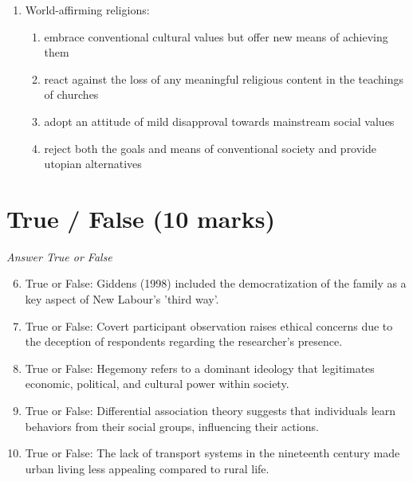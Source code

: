 \documentclass[12pt]{article}
\begin{document}
\begin{enumerate}[label=\arabic*.]
\begin{enumerate}[label=(\alph*)]
    \item They are cultures as well as churches.
    \item They practice separation of church and state.
    \item They exclude women as clergy.
    \item They are monotheistic.
\end{enumerate}
\item World-affirming religions:
\begin{enumerate}[label=(\alph*)]
    \item embrace conventional cultural values but offer new means of achieving them
    \item react against the loss of any meaningful religious content in the teachings of churches
    \item adopt an attitude of mild disapproval towards mainstream social values
    \item reject both the goals and means of conventional society and provide utopian alternatives
\end{enumerate}
\end{enumerate}

\section*{True / False (10 marks)}
\textit{Answer True or False}
\begin{enumerate}[label=\arabic*.]
\setcounter{enumi}{5}
\item True or False: Giddens (1998) included the democratization of the family as a key aspect of New Labour's 'third way'.
\item True or False: Covert participant observation raises ethical concerns due to the deception of respondents regarding the researcher's presence.
\item True or False: Hegemony refers to a dominant ideology that legitimates economic, political, and cultural power within society.
\item True or False: Differential association theory suggests that individuals learn behaviors from their social groups, influencing their actions.
\item True or False: The lack of transport systems in the nineteenth century made urban living less appealing compared to rural life.
\end{enumerate}
\end{document}
